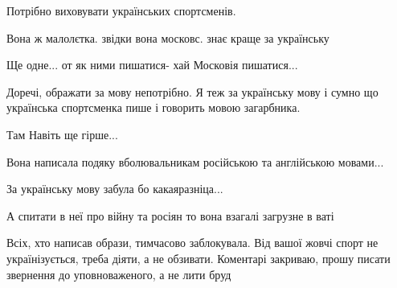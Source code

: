 \begin{itemize}
Потрібно виховувати українських спортсменів.

 
Вона ж малолєтка. звідки вона московс. знає краще за українську

 
Ще одне... от як ними пишатися- хай Московія пишатися...

 
Доречі, ображати за мову непотрібно. Я теж за українську мову і сумно що
українська спортсменка пише і говорить мовою загарбника.

 
Там Навіть ще гірше...

Вона написала подяку вболювальникам російською та англійською мовами...

За українську мову забула бо какаяразніца...

А спитати в неї про війну та росіян то вона взагалі загрузне в ваті


 

Всіх, хто написав образи, тимчасово заблокувала. Від вашої жовчі спорт не
українізується, треба діяти, а не обзивати. Коментарі закриваю, прошу писати
звернення до уповноваженого, а не лити бруд

\end{itemize}

